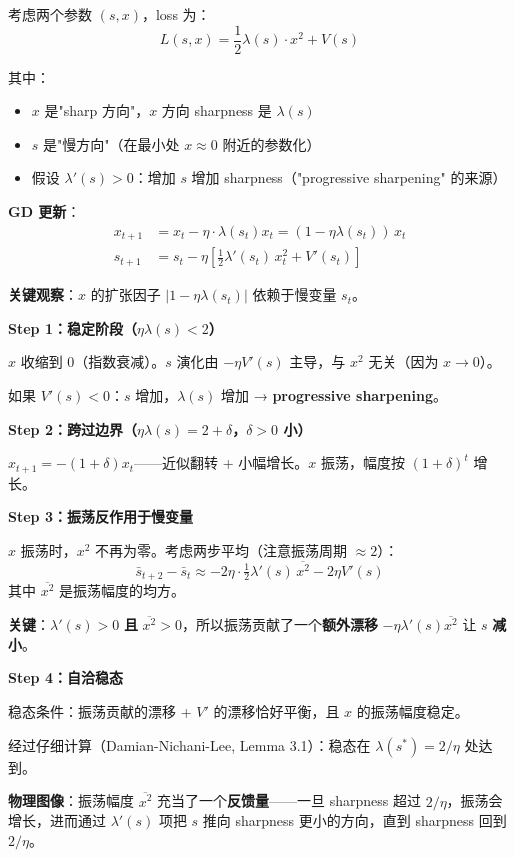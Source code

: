 \documentclass[12pt, a4paper]{ctexart}
\begin{document}
\begin{blackboard}

考虑两个参数 $(s, x)$，loss 为：
\[
L(s, x) = \frac{1}{2}\lambda(s) \cdot x^2 + V(s)
\]

其中：
\begin{itemize}
\item $x$ 是"sharp 方向"，$x$ 方向 sharpness 是 $\lambda(s)$
\item $s$ 是"慢方向"（在最小处 $x \approx 0$ 附近的参数化）
\item 假设 $\lambda'(s) > 0$：增加 $s$ 增加 sharpness（"progressive sharpening" 的来源）
\end{itemize}

\textbf{GD 更新}：
\begin{align}
x_{t+1} &= x_t - \eta \cdot \lambda(s_t) x_t = (1 - \eta\lambda(s_t))\, x_t \label{eq:eos-x}\\
s_{t+1} &= s_t - \eta \left[\tfrac{1}{2}\lambda'(s_t)\, x_t^2 + V'(s_t)\right] \label{eq:eos-s}
\end{align}

\textbf{关键观察}：$x$ 的扩张因子 $|1 - \eta\lambda(s_t)|$ 依赖于慢变量 $s_t$。

\textbf{Step 1：稳定阶段（$\eta\lambda(s) < 2$）}

$x$ 收缩到 0（指数衰减）。$s$ 演化由 $-\eta V'(s)$ 主导，与 $x^2$ 无关（因为 $x \to 0$）。

如果 $V'(s) < 0$：$s$ 增加，$\lambda(s)$ 增加 → \textbf{progressive sharpening}。

\textbf{Step 2：跨过边界（$\eta\lambda(s) = 2 + \delta$，$\delta > 0$ 小）}

$x_{t+1} = -(1+\delta) x_t$——近似翻转 + 小幅增长。$x$ 振荡，幅度按 $(1+\delta)^t$ 增长。

\textbf{Step 3：振荡反作用于慢变量}

$x$ 振荡时，$x^2$ 不再为零。考虑两步平均（注意振荡周期 $\approx 2$）：
\[
\bar{s}_{t+2} - \bar{s}_t \approx -2\eta \cdot \tfrac{1}{2}\lambda'(s)\, \overline{x^2} - 2\eta V'(s)
\]
其中 $\overline{x^2}$ 是振荡幅度的均方。

\textbf{关键}：$\lambda'(s) > 0$ \textbf{且} $\overline{x^2} > 0$，所以振荡贡献了一个\textbf{额外漂移} $-\eta\lambda'(s)\overline{x^2}$ 让 $s$ \textbf{减小}。

\textbf{Step 4：自洽稳态}

稳态条件：振荡贡献的漂移 + $V'$ 的漂移恰好平衡，且 $x$ 的振荡幅度稳定。

经过仔细计算（Damian-Nichani-Lee, Lemma 3.1）：稳态在 $\lambda(s^*) = 2/\eta$ 处达到。

\textbf{物理图像}：振荡幅度 $\overline{x^2}$ 充当了一个\textbf{反馈量}——一旦 sharpness 超过 $2/\eta$，振荡会增长，进而通过 $\lambda'(s)$ 项把 $s$ 推向 sharpness 更小的方向，直到 sharpness 回到 $2/\eta$。

\end{blackboard}
\end{document}
